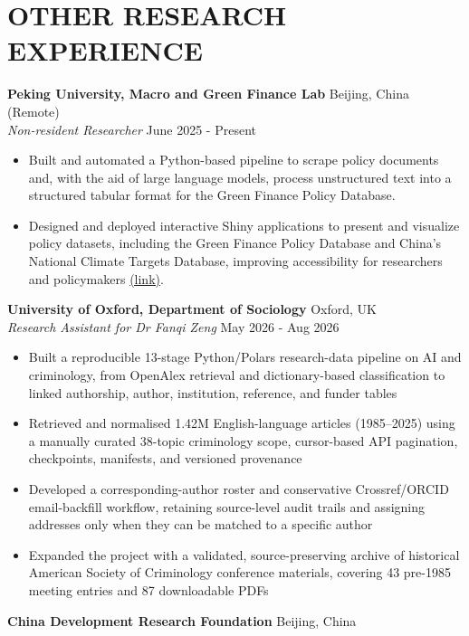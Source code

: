 \documentclass[a4paper,9pt]{extarticle}
\begin{document}
\section*{OTHER RESEARCH EXPERIENCE}
\noindent
\textbf{Peking University, Macro and Green Finance Lab} \hfill Beijing, China (Remote) \\
\textit{Non-resident Researcher} \hfill June 2025 - Present
\begin{itemize}
    \item Built and automated a Python-based pipeline to scrape policy documents and, with the aid of large language models, process unstructured text into a structured tabular format for the Green Finance Policy Database.
    \item Designed and deployed interactive Shiny applications to present and visualize policy datasets, including the Green Finance Policy Database and China's National Climate Targets Database, improving accessibility for researchers and policymakers \href{https://mgflab.nsd.pku.edu.cn/en/MGFDATEBASE/POLICYTRACKER2/index.htm}{(link)}.
\end{itemize}
\noindent
\textbf{University of Oxford, Department of Sociology} \hfill Oxford, UK \\
\textit{Research Assistant for Dr Fanqi Zeng} \hfill May 2026 - Aug 2026
\begin{itemize}
    \item Built a reproducible 13-stage Python/Polars research-data pipeline on AI and criminology, from OpenAlex retrieval and dictionary-based classification to linked authorship, author, institution, reference, and funder tables
    \item Retrieved and normalised 1.42M English-language articles (1985--2025) using a manually curated 38-topic criminology scope, cursor-based API pagination, checkpoints, manifests, and versioned provenance
    \item Developed a corresponding-author roster and conservative Crossref/ORCID email-backfill workflow, retaining source-level audit trails and assigning addresses only when they can be matched to a specific author
    \item Expanded the project with a validated, source-preserving archive of historical American Society of Criminology conference materials, covering 43 pre-1985 meeting entries and 87 downloadable PDFs
\end{itemize}
\noindent
\textbf{China Development Research Foundation} \hfill Beijing, China \\
\end{document}
